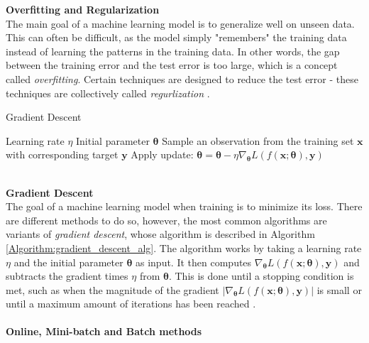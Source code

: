\documentclass[./main.tex]{subfiles}
\begin{document}
\noindent \textbf{Overfitting and Regularization} \\
The main goal of a machine learning model is to generalize well on unseen data. This can often be difficult, as the model simply "remembers" the training data instead of learning the patterns in the training data. In other words, the gap between the training error and the test error is too large, which is a concept called \textit{overfitting}. Certain techniques are designed to reduce the test error - these techniques are collectively called \textit{regurlization} \cite{DeepLearning}. 
\\
\begin{algorithm}[htbp]
    \caption{Gradient Descent \cite{d2l}}
    \label{Algorithm:gradient_descent_alg}
    \begin{algorithmic}[1]
        \Require Learning rate $\eta$
        \Require Initial parameter $\bm{\theta}$
            \State Sample an observation from the training set $\bm{x}$ with corresponding target $\bm{y}$
            \State Apply update: $\bm{\theta} = \bm{\theta} - \eta \nabla_{\bm{\theta}} L\left( f(\bm{x}; \bm{\theta}), \bm{y} \right)$
        \EndWhile
    \end{algorithmic}
\end{algorithm}
\\
\textbf{Gradient Descent} \\
The goal of a machine learning model when training is to minimize its loss. There are different methods to do so, however, the most common algorithms are variants of \textit{gradient descent}, whose algorithm is described in Algorithm \ref{Algorithm:gradient_descent_alg}. The algorithm works by taking a learning rate $\eta$ and the initial parameter $\bm{\theta}$ as input. It then computes $\nabla_{\bm{\theta}} L\left( f(\bm{x}; \bm{\theta}), \bm{y} \right)$ and subtracts the gradient times $\eta$ from $\bm{\theta}$. This is done until a stopping condition is met, such as when the magnitude of the gradient $\left|  \nabla_{\bm{\theta}} L\left( f(\bm{x}; \bm{\theta}), \bm{y} \right) \right|$ is small or until a maximum amount of iterations has been reached \cite{d2l}.
\\
\\
\noindent \textbf{Online, Mini-batch and Batch methods} \\
\end{document}
